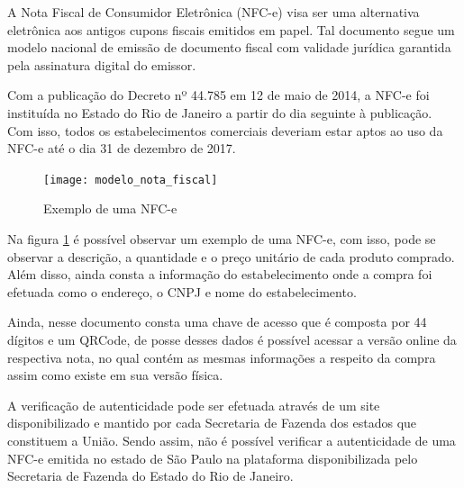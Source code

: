 A Nota Fiscal de Consumidor Eletrônica (NFC-e) visa ser uma alternativa eletrônica aos antigos cupons fiscais emitidos em papel. Tal documento segue um modelo nacional de emissão de documento fiscal com validade jurídica garantida pela assinatura digital do emissor.

Com a publicação do Decreto nº 44.785 em 12 de maio de 2014, a NFC-e foi instituída no Estado do Rio de Janeiro a partir do dia seguinte à publicação. Com isso, todos os estabelecimentos comerciais deveriam estar aptos ao uso da NFC-e até o dia 31 de dezembro de 2017.

\begin{figure}[h]
    \centering
    \texttt{[image: modelo\_nota\_fiscal]}
    \caption{Exemplo de uma NFC-e}
    \label{modeloNfce}
\end{figure}

Na figura \ref{modeloNfce} é possível observar um exemplo de uma NFC-e, com isso, pode se observar a descrição, a quantidade e o preço unitário de cada produto comprado. Além disso, ainda consta a informação do estabelecimento onde a compra foi efetuada como o endereço, o CNPJ e nome do estabelecimento.

Ainda, nesse documento consta uma chave de acesso que é composta por 44 dígitos e um QRCode, de posse desses dados é possível acessar a versão online da respectiva nota, no qual contém as mesmas informações a respeito da compra assim como existe em sua versão física.


A verificação de autenticidade pode ser efetuada através de um site disponibilizado e mantido por cada Secretaria de Fazenda dos estados que constituem a União. Sendo assim, não é possível verificar a autenticidade de uma NFC-e emitida no estado de São Paulo na plataforma disponibilizada pelo Secretaria de Fazenda do Estado do Rio de Janeiro.